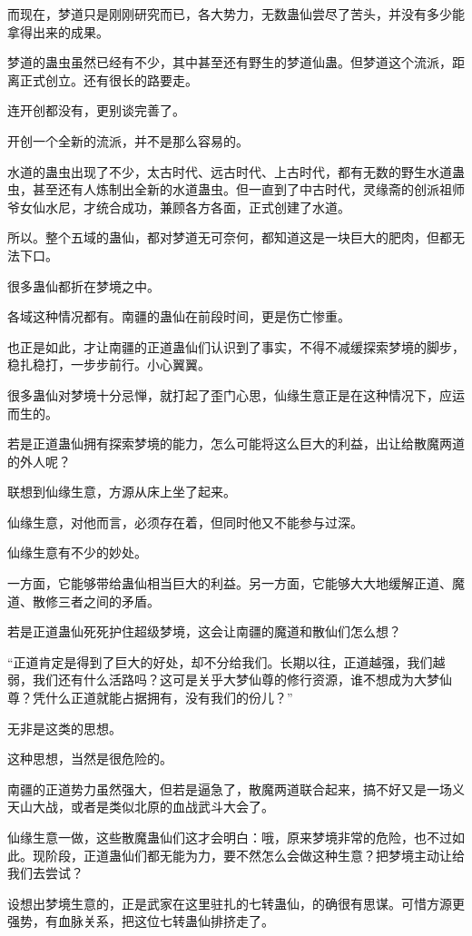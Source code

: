 \begin{this_body}
而现在，梦道只是刚刚研究而已，各大势力，无数蛊仙尝尽了苦头，并没有多少能拿得出来的成果。

梦道的蛊虫虽然已经有不少，其中甚至还有野生的梦道仙蛊。但梦道这个流派，距离正式创立。还有很长的路要走。

连开创都没有，更别谈完善了。

开创一个全新的流派，并不是那么容易的。

水道的蛊虫出现了不少，太古时代、远古时代、上古时代，都有无数的野生水道蛊虫，甚至还有人炼制出全新的水道蛊虫。但一直到了中古时代，灵缘斋的创派祖师爷女仙水尼，才统合成功，兼顾各方各面，正式创建了水道。

所以。整个五域的蛊仙，都对梦道无可奈何，都知道这是一块巨大的肥肉，但都无法下口。

很多蛊仙都折在梦境之中。

各域这种情况都有。南疆的蛊仙在前段时间，更是伤亡惨重。

也正是如此，才让南疆的正道蛊仙们认识到了事实，不得不减缓探索梦境的脚步，稳扎稳打，一步步前行。小心翼翼。

很多蛊仙对梦境十分忌惮，就打起了歪门心思，仙缘生意正是在这种情况下，应运而生的。

若是正道蛊仙拥有探索梦境的能力，怎么可能将这么巨大的利益，出让给散魔两道的外人呢？

联想到仙缘生意，方源从床上坐了起来。

仙缘生意，对他而言，必须存在着，但同时他又不能参与过深。

仙缘生意有不少的妙处。

一方面，它能够带给蛊仙相当巨大的利益。另一方面，它能够大大地缓解正道、魔道、散修三者之间的矛盾。

若是正道蛊仙死死护住超级梦境，这会让南疆的魔道和散仙们怎么想？

“正道肯定是得到了巨大的好处，却不分给我们。长期以往，正道越强，我们越弱，我们还有什么活路吗？这可是关乎大梦仙尊的修行资源，谁不想成为大梦仙尊？凭什么正道就能占据拥有，没有我们的份儿？”

无非是这类的思想。

这种思想，当然是很危险的。

南疆的正道势力虽然强大，但若是逼急了，散魔两道联合起来，搞不好又是一场义天山大战，或者是类似北原的血战武斗大会了。

仙缘生意一做，这些散魔蛊仙们这才会明白：哦，原来梦境非常的危险，也不过如此。现阶段，正道蛊仙们都无能为力，要不然怎么会做这种生意？把梦境主动让给我们去尝试？

设想出梦境生意的，正是武家在这里驻扎的七转蛊仙，的确很有思谋。可惜方源更强势，有血脉关系，把这位七转蛊仙排挤走了。


\end{this_body}
